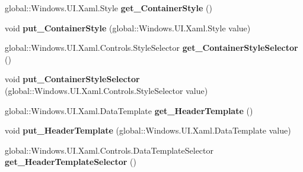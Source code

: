 \begin{DoxyCompactItemize}
\item 
\mbox{\label{interface_windows_1_1_u_i_1_1_xaml_1_1_controls_1_1_i_group_style_af3ec155955e17dff84857535074042f7}} 
global\+::\+Windows.\+U\+I.\+Xaml.\+Style {\bfseries get\+\_\+\+Container\+Style} ()
\item 
\mbox{\label{interface_windows_1_1_u_i_1_1_xaml_1_1_controls_1_1_i_group_style_af0d3f03b233d17bef1f3a1cf829ca1b7}} 
void {\bfseries put\+\_\+\+Container\+Style} (global\+::\+Windows.\+U\+I.\+Xaml.\+Style value)
\item 
\mbox{\label{interface_windows_1_1_u_i_1_1_xaml_1_1_controls_1_1_i_group_style_a56b3461ac75ac985ef5d7d81a6c6a9cf}} 
global\+::\+Windows.\+U\+I.\+Xaml.\+Controls.\+Style\+Selector {\bfseries get\+\_\+\+Container\+Style\+Selector} ()
\item 
\mbox{\label{interface_windows_1_1_u_i_1_1_xaml_1_1_controls_1_1_i_group_style_a02ae70e78fa1f73a90c99f25ffb93918}} 
void {\bfseries put\+\_\+\+Container\+Style\+Selector} (global\+::\+Windows.\+U\+I.\+Xaml.\+Controls.\+Style\+Selector value)
\item 
\mbox{\label{interface_windows_1_1_u_i_1_1_xaml_1_1_controls_1_1_i_group_style_ae2c73494e7acf4a2194f66515b44cb36}} 
global\+::\+Windows.\+U\+I.\+Xaml.\+Data\+Template {\bfseries get\+\_\+\+Header\+Template} ()
\item 
\mbox{\label{interface_windows_1_1_u_i_1_1_xaml_1_1_controls_1_1_i_group_style_a740a71b8b3a99bb878e9ba66ebae7c4d}} 
void {\bfseries put\+\_\+\+Header\+Template} (global\+::\+Windows.\+U\+I.\+Xaml.\+Data\+Template value)
\item 
\mbox{\label{interface_windows_1_1_u_i_1_1_xaml_1_1_controls_1_1_i_group_style_a28c8a1b47d3dbd9c19e2499b6b78dd6b}} 
global\+::\+Windows.\+U\+I.\+Xaml.\+Controls.\+Data\+Template\+Selector {\bfseries get\+\_\+\+Header\+Template\+Selector} ()

\end{DoxyCompactItemize}
